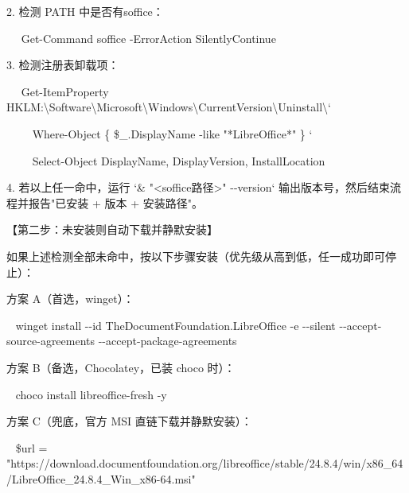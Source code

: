 \documentclass[
  american,
  chinese,
]{ctexart}
\begin{document}
\foreignlanguage{american}{2. }{检测}\foreignlanguage{american}{ PATH }{中是否有}\foreignlanguage{american}{ {soffice}}{：}\foreignlanguage{american}{}

\foreignlanguage{american}{{~~ }Get-Command {soffice}
-{ErrorAction} {SilentlyContinue}}

\foreignlanguage{american}{3. }{检测注册表卸载项：}\foreignlanguage{american}{}

\foreignlanguage{american}{{~~ }Get-{ItemProperty}
HKLM:\textbackslash Software\textbackslash Microsoft\textbackslash Windows\textbackslash CurrentVersion\textbackslash Uninstall\textbackslash* `}

\foreignlanguage{american}{{~~~~ }\textbar{} Where-Object {\{ \$\_.DisplayName} -like "*LibreOffice*{"
\}} `}

\foreignlanguage{american}{{~~~~ }\textbar{} Select-Object
DisplayName, {DisplayVersion}, {InstallLocation}}

\foreignlanguage{american}{4. }{若以上任{一}命中，运行}\foreignlanguage{american}{ `\& "\textless{}{soffice}}{路径}\foreignlanguage{american}{\textgreater" -\/-version` }{输出版本号，然后结束流程并报告}\foreignlanguage{american}{"}{已安装}\foreignlanguage{american}{ + }{版本}\foreignlanguage{american}{ + }{安装路径}\foreignlanguage{american}{"}{。}\foreignlanguage{american}{}

{【第二步：未安装则自动下载并静默安装】}\foreignlanguage{american}{}

{如果上述检测全部未命中，按以下步骤安装（优先级从高到低，任{一}成功即可停止）：}\foreignlanguage{american}{}

{方案}\foreignlanguage{american}{ A}{（首选，}{\foreignlanguage{american}{winget}}{）：}\foreignlanguage{american}{}

\foreignlanguage{american}{{~ }{winget} install
-\/-id {TheDocumentFoundation.LibreOffice} -e -\/-silent
-\/-accept-source-agreements -\/-accept-package-agreements}

{方案}\foreignlanguage{american}{ B}{（备选，}\foreignlanguage{american}{Chocolatey}{，已装}\foreignlanguage{american}{ {choco} }{时）：}\foreignlanguage{american}{}

\foreignlanguage{american}{{~ }{choco} install {libreoffice}-fresh -y}

{方案}\foreignlanguage{american}{ C}{（兜底，官方}\foreignlanguage{american}{ MSI }{直链下载并静默安装）：}\foreignlanguage{american}{}

\foreignlanguage{american}{{~ }\${url} =
"https://download.documentfoundation.org/libreoffice/stable/24.8.4/win/x86\_64/LibreOffice\_24.8.4\_Win\_x86-64.msi"}
\end{document}
